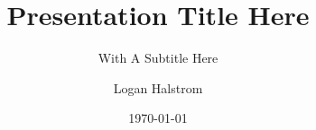 

\documentclass[aspectratio=169]{beamer}

\newcommand\runlocal{0}
\newcommand\usegrid{1}
\newcommand\filledtitle{1}
\newcommand\themecolors{0}    %
\newcommand\newfootercenter{0} %
\newcommand\footercenter{new center footer text rather than date}
\newcommand\totframesinfoot{0} %
\newcommand\titletextwidth{12cm} %
\newcommand\titleleftalignfrac{0.24} %
\newcommand\titleheightfrac{0.775} %
\ifnum\runlocal=1%
\else%
    \newcommand\remote{\string~/lib/beamer/nasa}
    \usepackage{\remote/beamerthemenasa}
\fi%









\title{Presentation Title Here}
\subtitle{With A Subtitle Here}
\author{Logan Halstrom}
\date{\today}

\ifnum\runlocal=1%
    \newcommand\EGlogo{Images/EG_Logo.png}
    \newcommand\SLSpic{Images/Orion_SLS_trim.png}
\else%
    \newcommand\EGlogo{\remote/Images/EG_Logo.png}
    \newcommand\SLSpic{\remote/Images/SLS_Orange.png}
\fi%
{
\begin{textblock*}{0cm}(-0.5cm,0.5cm) %
\texttt{[image: \\EGlogo]}
\end{textblock*}

\begin{textblock*}{0cm}(0.7\textwidth,0.25cm)
\texttt{[image: \\SLSpic]}
\end{textblock*}
}


